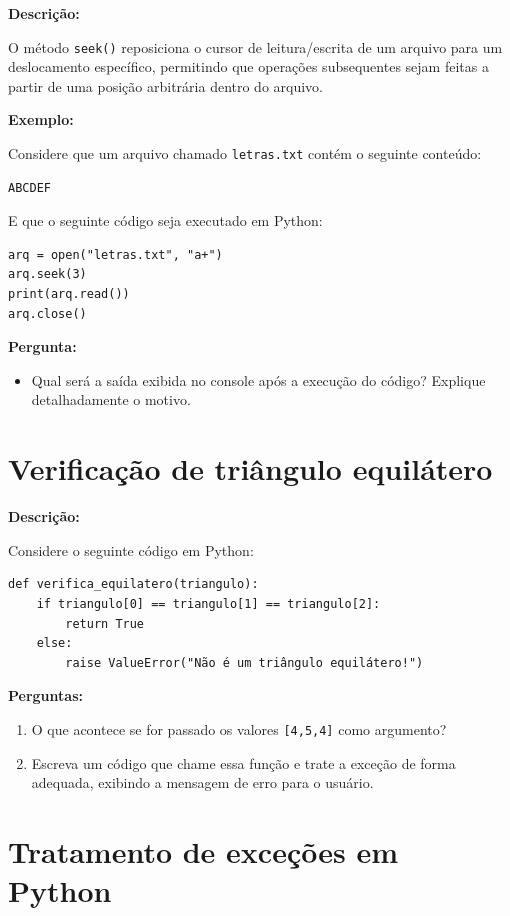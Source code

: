 \textbf{Descrição:}

O método \texttt{seek()} reposiciona o cursor de leitura/escrita de um arquivo para um deslocamento específico, permitindo que operações subsequentes sejam feitas a partir de uma posição arbitrária dentro do arquivo.

\textbf{Exemplo:}

Considere que um arquivo chamado \texttt{letras.txt} contém o seguinte conteúdo:

\begin{verbatim}
ABCDEF
\end{verbatim}

E que o seguinte código seja executado em Python:

\begin{verbatim}
arq = open("letras.txt", "a+")
arq.seek(3)
print(arq.read())
arq.close()
\end{verbatim}

\textbf{Pergunta:}

\begin{itemize}
    \item Qual será a saída exibida no console após a execução do código? Explique detalhadamente o motivo.
\end{itemize}

\section{Verificação de triângulo equilátero}

\textbf{Descrição:}

Considere o seguinte código em Python:

\begin{verbatim}
def verifica_equilatero(triangulo):
    if triangulo[0] == triangulo[1] == triangulo[2]:
        return True
    else:
        raise ValueError("Não é um triângulo equilátero!")
\end{verbatim}

\textbf{Perguntas:}

\begin{enumerate}
    \item[a)] O que acontece se for passado os valores \texttt{[4,5,4]} como argumento?
    \item[b)] Escreva um código que chame essa função e trate a exceção de forma adequada, exibindo a mensagem de erro para o usuário.
\end{enumerate}


\section{Tratamento de exceções em Python}

